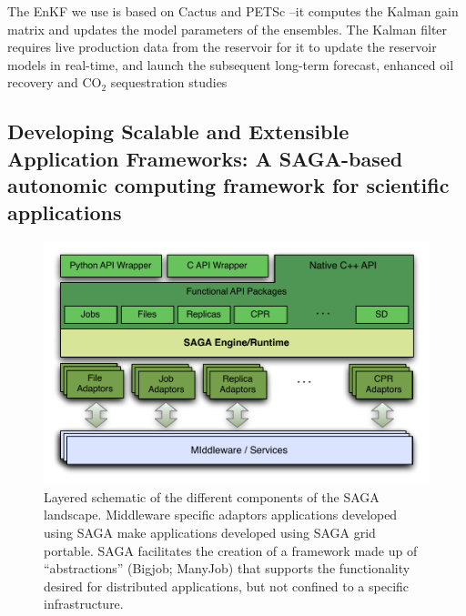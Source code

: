 \documentclass{acm_proc_article-sp}
\begin{document}
The EnKF we use is based on Cactus and PETSc --it computes the Kalman
gain matrix and updates the model parameters of the ensembles. The
Kalman filter requires live production data from the reservoir for it
to update the reservoir models in real-time, and launch the subsequent
long-term forecast, enhanced oil recovery and CO$_2$ sequestration
studies

\subsection{Developing Scalable and Extensible Application
  Frameworks: A SAGA-based autonomic computing framework for
  scientific applications}

\begin{figure}[!ht]
\begin{center}
     \includegraphics[scale=0.53]{stci-saga-figures-1.pdf}
\end{center}
 \caption{\small Layered schematic of the different components
    of the SAGA landscape.  Middleware specific adaptors applications
    developed using SAGA make applications developed using SAGA grid
    portable. SAGA facilitates the
    creation of a framework made up of ``abstractions'' (Bigjob;
    ManyJob) that supports the functionality desired for distributed
    applications, but not confined to a specific infrastructure.}
 \label{sagalayer}
\end{figure}
\end{document}
